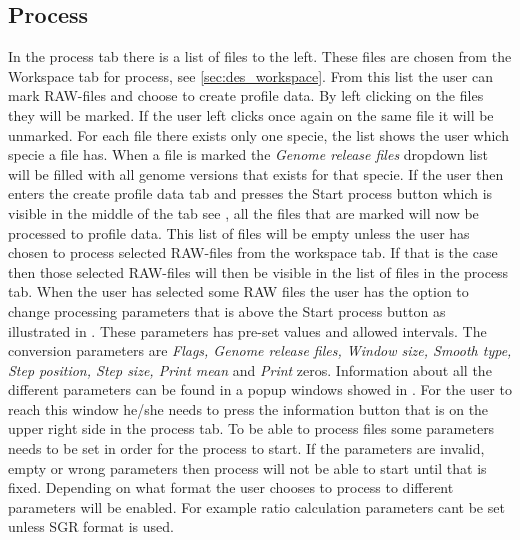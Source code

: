 \subsection{Process}
In the process tab there is a list of files to the left. These files are chosen from the Workspace tab for process, see \ref{sec:des_workspace}. From this list the user can mark RAW-files and choose to create profile data. By left clicking on the files they will be marked. If the user left clicks once again on the same file it will be unmarked. For each file there exists only one specie, the list shows the user which specie a file has. When a file is marked the \emph{Genome release files} dropdown list will be filled with all genome versions that exists for that specie. If the user then enters the create profile data tab and presses the Start process button which is visible in the middle of the tab see , all the files that are marked will now be processed to profile data. This list of files will be empty unless the user has chosen to process selected RAW-files from the workspace tab. If that is the case then those selected RAW-files will then be visible in the list of files in the process tab. When the user has selected some RAW files the user has the option to change processing parameters that is above the Start process button as illustrated in . These parameters has pre-set values and allowed intervals. The conversion parameters are \emph{Flags, Genome release files, Window size, Smooth type, Step position, Step size, Print mean} and \emph{Print} zeros. Information about all the different parameters can be found in a popup windows showed in . For the user to reach this window he/she needs to press the information button that is on the upper right side in the process tab. To be able to process files some parameters needs to be set in order for the process to start. If the parameters are invalid, empty or wrong parameters then process will not be able to start until that is fixed. Depending on what format the user chooses to process to different parameters will be enabled. For example ratio calculation parameters cant be set unless SGR format is used.

